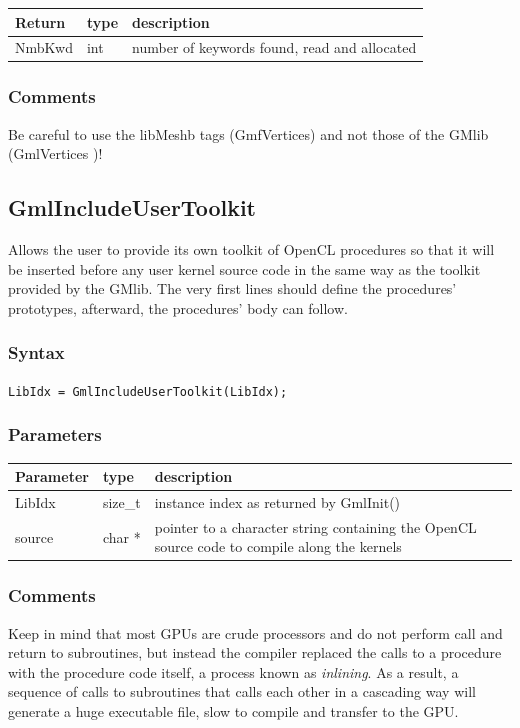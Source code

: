 \documentclass[a4paper,12pt]{article}
\begin{document}
\medskip

\begin{tabular}{|m{2cm}|m{1.5cm}|m{10.5cm}|}
\hline
Return     & type   & description \\
\hline
NmbKwd     & int    & number of keywords found, read and allocated \\
\hline
\end{tabular}

\subsubsection*{Comments}
Be careful to use the libMeshb tags (GmfVertices) and not those of the GMlib (GmlVertices )!


\subsection{GmlIncludeUserToolkit}
Allows the user to provide its own toolkit of OpenCL procedures so that it will be inserted before any user kernel source code in the same way as the toolkit provided by the GMlib. The very first lines should define the procedures' prototypes, afterward, the procedures' body can follow.

\subsubsection*{Syntax}
{\tt LibIdx = GmlIncludeUserToolkit(LibIdx);}

\subsubsection*{Parameters}
\begin{tabular}{|m{2cm}|m{1.5cm}|m{10.5cm}|}
\hline
Parameter  & type   & description \\
\hline
LibIdx     & size\_t & instance index as returned by GmlInit() \\
\hline
source     & char *  & pointer to a character string containing the OpenCL source code to compile along the kernels \\
\hline
\end{tabular}

\subsubsection*{Comments}
Keep in mind that most GPUs are crude processors and do not perform call and return to subroutines, but instead the compiler replaced the calls to a procedure with the procedure code itself, a process known as \emph{inlining}. As a result, a sequence of calls to subroutines that calls each other in a cascading way will generate a huge executable file, slow to compile and transfer to the GPU.
\end{document}
